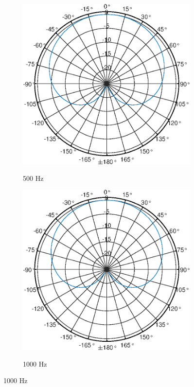 \begin{figure}[bth]
\begin{subfigure}{.25\textwidth}
        \label{fig:Polar_250}
    \end{subfigure}%
    \begin{subfigure}{.25\textwidth}
        \centering
        \caption{500 Hz}
        \includegraphics[width=\linewidth]{Figures/KM184_500Hz}
        \label{fig:Polar_500}
    \end{subfigure}%
    \begin{subfigure}{.25\textwidth}
        \centering
        \caption{1000 Hz}
        \includegraphics[width=\linewidth]{Figures/KM184_1000Hz}
        \label{fig:Polar_1000}
    \end{subfigure}


\end{figure}
